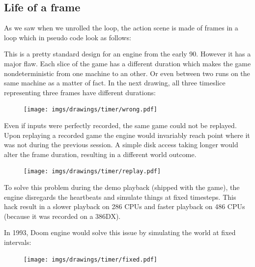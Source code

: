 \subsection{Life of a frame}
As we saw when we unrolled the loop, the action scene is made of frames in a loop which in pseudo code look as follows:\\
\par
\begin{minipage}{\textwidth}
 
 \end{minipage}
\par
This is a pretty standard design for an engine from the early 90. However it has a major flaw. Each slice of the game has a different duration which makes the game nondeterministic from one machine to an other. Or even between two runs on the same machine as a matter of fact. In the next drawing, all three timeslice representing three frames have different durations:\\
\begin{figure}[H]
\centering
 \texttt{[image: imgs/drawings/timer/wrong.pdf]}
 
 \end{figure}
  Even if inputs were perfectly recorded, the same game could not be replayed. Upon replaying a recorded game the engine would invariably reach point where it was not during the previous session. A simple disk access taking longer would alter the frame duration, resulting in a different world outcome.\\
 \begin{figure}[H]
\centering
 \texttt{[image: imgs/drawings/timer/replay.pdf]}
 
 \end{figure}
\par
To solve this problem during the demo playback (shipped with the game), the engine disregards the heartbeats and simulate things at fixed timesteps. This hack result in a slower playback on 286 CPUs and faster playback on 486 CPUs (because it was recorded on a 386DX).\\
\par
{} In 1993, Doom engine would solve this issue by simulating the world at fixed intervals:\\
\par
\begin{minipage}{\textwidth}
 
 \end{minipage}
\par
 \begin{figure}[H]
\centering
 \texttt{[image: imgs/drawings/timer/fixed.pdf]}
 
 \end{figure}

